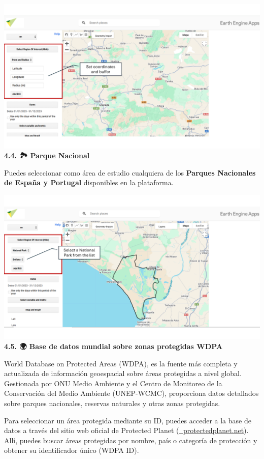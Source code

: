 \documentclass[
]{book}
\begin{document}
\includegraphics{assets/buffer.png}
\textbf{4.4. 🏞️ Parque Nacional}

Puedes seleccionar como área de estudio cualquiera de los \textbf{Parques Nacionales de España y Portugal} disponibles en la plataforma.

\includegraphics{assets/np.png}
\textbf{4.5. 🌍 Base de datos mundial sobre zonas protegidas WDPA}

World Database on Protected Areas (WDPA), es la fuente más completa y actualizada de información geoespacial sobre áreas protegidas a nivel global. Gestionada por ONU Medio Ambiente y el Centro de Monitoreo de la Conservación del Medio Ambiente (UNEP-WCMC), proporciona datos detallados sobre parques nacionales, reservas naturales y otras zonas protegidas.

Para seleccionar un área protegida mediante su ID, puedes acceder a la base de datos a través del sitio web oficial de Protected Planet (\href{https://www.protectedplanet.net/}{🔗 protectedplanet.net}). Allí, puedes buscar áreas protegidas por nombre, país o categoría de protección y obtener su identificador único (WDPA ID).
\end{document}
